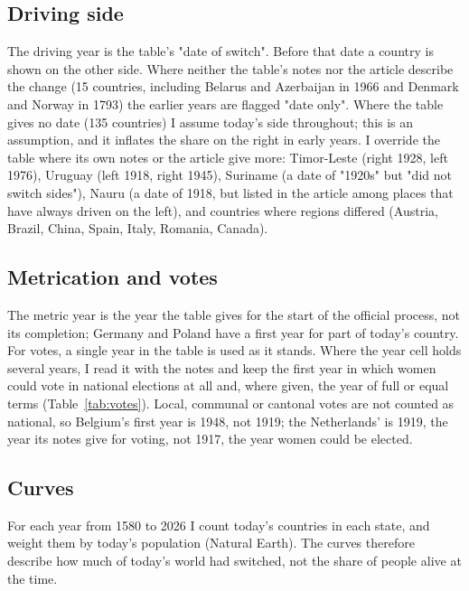 \documentclass[11pt,a4paper]{article}
\begin{document}
\subsection{Driving side}
The driving year is the table's "date of switch". Before that date a country is shown on the other side. Where neither the table's notes nor the article describe the change (15 countries, including Belarus and Azerbaijan in 1966 and Denmark and Norway in 1793) the earlier years are flagged "date only". Where the table gives no date (135 countries) I assume today's side throughout; this is an assumption, and it inflates the share on the right in early years. I override the table where its own notes or the article give more: Timor-Leste (right 1928, left 1976), Uruguay (left 1918, right 1945), Suriname (a date of "1920s" but "did not switch sides"), Nauru (a date of 1918, but listed in the article among places that have always driven on the left), and countries where regions differed (Austria, Brazil, China, Spain, Italy, Romania, Canada).

\subsection{Metrication and votes}
The metric year is the year the table gives for the start of the official process, not its completion; Germany and Poland have a first year for part of today's country. For votes, a single year in the table is used as it stands. Where the year cell holds several years, I read it with the notes and keep the first year in which women could vote in national elections at all and, where given, the year of full or equal terms (Table~\ref{tab:votes}). Local, communal or cantonal votes are not counted as national, so Belgium's first year is 1948, not 1919; the Netherlands' is 1919, the year its notes give for voting, not 1917, the year women could be elected.

\subsection{Curves}
For each year from 1580 to 2026 I count today's countries in each state, and weight them by today's population (Natural Earth). The curves therefore describe how much of today's world had switched, not the share of people alive at the time.
\end{document}
